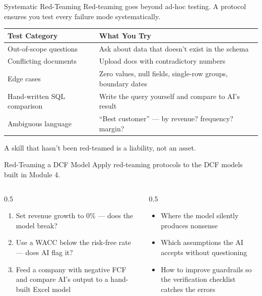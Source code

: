 \documentclass[aspectratio=169]{beamer}
\begin{document}
\begin{frame}{Systematic Red-Teaming}
Red-teaming goes beyond ad-hoc testing.  A \alert{protocol} ensures you test every failure mode systematically.
\vspace{0.3cm}
\begin{center}\small
\begin{tabular}{@{} l l @{}}
\toprule
\textbf{Test Category} & \textbf{What You Try} \\
\midrule
Out-of-scope questions & Ask about data that doesn't exist in the schema \\
Conflicting documents & Upload docs with contradictory numbers \\
Edge cases & Zero values, null fields, single-row groups, boundary dates \\
Hand-written SQL comparison & Write the query yourself and compare to AI's result \\
Ambiguous language & ``Best customer'' --- by revenue? frequency? margin? \\
\bottomrule
\end{tabular}
\end{center}
\vspace{0.3cm}
\alert{A skill that hasn't been red-teamed is a liability, not an asset.}
\end{frame}

\begin{frame}[shrink=5]{Red-Teaming a DCF Model}
Apply red-teaming protocols to the DCF models built in Module 4.
\vspace{0.2cm}
\begin{columns}[T]
\begin{column}{0.5\textwidth}
\begin{shadedbox}[title=\textbf{Financial Red-Team Tests}]
\begin{enumerate}\small
  \item Set revenue growth to 0\% --- does the model break?
  \item Use a WACC below the risk-free rate --- does AI flag it?
  \item Feed a company with negative FCF and compare AI's output to a hand-built Excel model
\end{enumerate}
\end{shadedbox}
\end{column}
\begin{column}{0.5\textwidth}
\begin{shadedbox}[title=\textbf{What You Learn}]
\begin{itemize}\small
  \item Where the model silently produces nonsense
  \item Which assumptions the AI accepts without questioning
  \item How to improve guardrails so the verification checklist catches the errors
\end{itemize}
\end{shadedbox}
\end{column}
\end{columns}
\end{frame}
\end{document}
